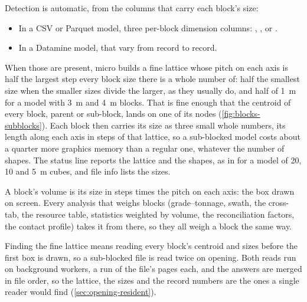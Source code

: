 
Detection is automatic, from the columns that carry each block's size:

\begin{itemize}
\item In a CSV or Parquet model, three per-block dimension columns:   ,   , or   .
\item In a Datamine  model,    that vary from record to record.
\end{itemize}

When those are present, micro builds a fine lattice whose pitch on each axis is half the largest step every block size there is a whole number of: half the smallest size when the smaller sizes divide the larger, as they usually do, and half of 1~m for a model with 3~m and 4~m blocks. That is fine enough that the centroid of every block, parent or sub-block, lands on one of its nodes (\cref{fig:blocks-subblocks}). Each block then carries its size as three small whole numbers, its length along each axis in steps of that lattice, so a sub-blocked model costs about a quarter more graphics memory than a regular one, whatever the number of shapes. The status line reports the lattice and the shapes, as in  for a model of 20, 10 and 5~m cubes, and file info lists the sizes.

A block's volume is its size in steps times the pitch on each axis: the box drawn on screen. Every analysis that weighs blocks (grade–tonnage, swath, the cross-tab, the resource table, statistics weighted by volume, the reconciliation factors, the contact profile) takes it from there, so they all weigh a block the same way.

Finding the fine lattice means reading every block's centroid and sizes before the first box is drawn, so a sub-blocked  file is read twice on opening. Both reads run on background workers, a run of the file's pages each, and the answers are merged in file order, so the lattice, the sizes and the record numbers are the ones a single reader would find (\cref{sec:opening-resident}).

